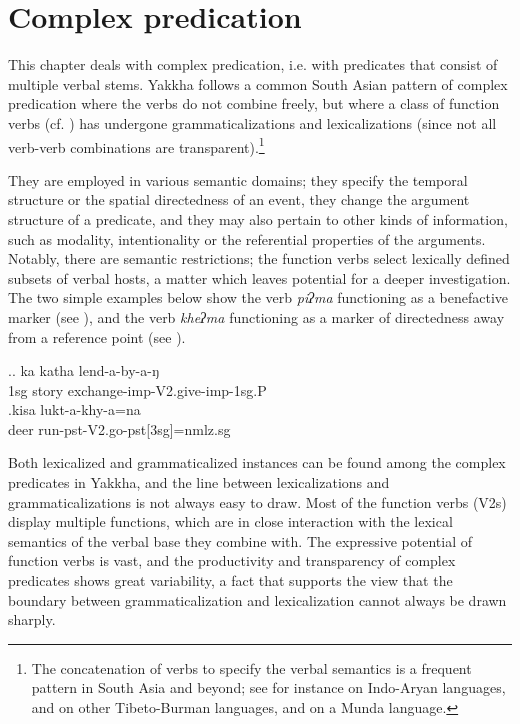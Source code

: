 ﻿\chapter{Complex predication}\label{verb-verb}

This chapter deals with complex predication, i.e. with predicates that consist of multiple verbal  stems. Yakkha follows a common South Asian pattern of complex predication where the verbs do not combine freely, but where  a class of function verbs (cf. \citet{Schultze-Berndt2006_Taking}) has undergone grammaticalizations and lexicalizations (since not all verb-verb combinations are transparent).\footnote{The concatenation of verbs to specify the verbal semantics is a frequent pattern in South Asia and beyond; see for instance \citet{Butt1995The-structure, Hook1991_Emergence, Masica2001The-definition, Nespital1997Hindi, Pokharel1999Compound} on Indo-Aryan languages, and \citet{Matisoff1969The-syntax, DeLancey1991The-origin,  Bickel1996Aspect, Ebert1997A-grammar, Doornenbal2009A-grammar, Kansakar2005Classical} on other Tibeto-Burman languages, and \citet{Peterson2010_Kharia} on a Munda language.}

 They are employed in various semantic domains; they specify the temporal structure or the spatial directedness of an event, they change the argument structure of a predicate, and  they may also pertain to other kinds of information, such as modality, intentionality or the  referential properties of the arguments. Notably, there are semantic restrictions; the function verbs select lexically defined subsets of verbal hosts, a matter which leaves potential for a deeper investigation. The two simple examples below show the verb \emph{piʔma}  functioning as a benefactive marker (see \Next[a]), and the verb \emph{kheʔma}  functioning as a marker of directedness away from a reference point (see \Next[b]).
 
 	\ex.\ag. ka katha lend-a-by-a-ŋ\\
	{\sc 1sg} story  exchange{\sc -imp-V2.give-imp-1sg.P}\\
	\bg.kisa lukt-a-khy-a=na\\
	deer run{\sc -pst-V2.go-pst[3sg]=nmlz.sg}\\
 
 

Both lexicalized and grammaticalized instances can be found among the complex predicates in Yakkha, and the line between lexicalizations and grammaticalizations is not always easy to draw. Most of the function verbs (V2s) display multiple functions, which are in close interaction with the lexical semantics of the verbal base they combine with. The expressive potential of function verbs is vast, and the productivity and transparency of complex predicates shows great variability, a fact that supports the view that the boundary between grammaticalization and lexicalization cannot always be drawn sharply. 

